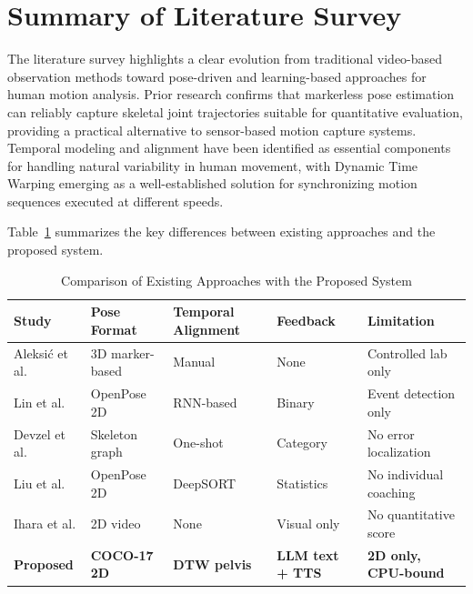 \documentclass[12pt, a4paper]{report}
\begin{document}
\section{Summary of Literature Survey}
The literature survey highlights a clear evolution from traditional video-based observation methods toward pose-driven and learning-based approaches for human motion analysis. Prior research confirms that markerless pose estimation can reliably capture skeletal joint trajectories suitable for quantitative evaluation, providing a practical alternative to sensor-based motion capture systems. Temporal modeling and alignment have been identified as essential components for handling natural variability in human movement, with Dynamic Time Warping emerging as a well-established solution for synchronizing motion sequences executed at different speeds.

Table~\ref{tab:lit_comparison} summarizes the key differences between existing approaches and the proposed system.

\begin{table}[H]
\centering
\caption{Comparison of Existing Approaches with the Proposed System}
\label{tab:lit_comparison}
\begin{tabular}{|p{2.8cm}|p{2.2cm}|p{2.2cm}|p{2.2cm}|p{2.8cm}|}
\hline
\textbf{Study} & \textbf{Pose Format} & \textbf{Temporal Alignment} & \textbf{Feedback} & \textbf{Limitation} \\
\hline
Aleksi\'{c} et al. & 3D marker-based & Manual & None & Controlled lab only \\
\hline
Lin et al. & OpenPose 2D & RNN-based & Binary & Event detection only \\
\hline
Devzel et al. & Skeleton graph & One-shot & Category & No error localization \\
\hline
Liu et al. & OpenPose 2D & DeepSORT & Statistics & No individual coaching \\
\hline
Ihara et al. & 2D video & None & Visual only & No quantitative score \\
\hline
\textbf{Proposed} & \textbf{COCO-17 2D} & \textbf{DTW pelvis} & \textbf{LLM text + TTS} & \textbf{2D only, CPU-bound} \\
\hline
\end{tabular}
\end{table}


\end{document}
